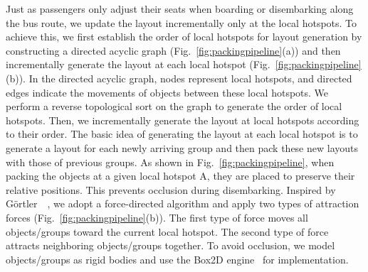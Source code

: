 Just as passengers only adjust their seats when boarding or disembarking along the bus route, we update the layout incrementally only at the local hotspots.
To achieve this, we first establish the order of local hotspots for layout generation by constructing a directed acyclic graph (Fig.~\ref{fig:packingpipeline}(a)) and then incrementally generate the layout at each local hotspot (Fig.~\ref{fig:packingpipeline}(b)).
In the directed acyclic graph, nodes represent local hotspots, and directed edges indicate the movements of objects between these local hotspots.
We perform a reverse topological sort on the graph to generate the order of local hotspots.
Then, we incrementally generate the layout at local hotspots according to their order.
The basic idea of generating the layout at each local hotspot is to generate a layout for each newly arriving group and then pack these new layouts with those of previous groups.
As shown in Fig.~\ref{fig:packingpipeline}, when packing the objects at a given local hotspot A, they are placed to preserve their relative positions.
This prevents occlusion during disembarking.
Inspired by G\"ortler~\etal~\cite{gortler2018bubble}, we adopt a force-directed algorithm and apply two types of attraction forces (Fig.~\ref{fig:packingpipeline}(b)).
The first type of force moves all objects/groups toward the current local hotspot.
The second type of force attracts neighboring objects/groups together.
To avoid occlusion, we model objects/groups as rigid bodies and use the Box2D engine~\cite{catto2010box2d} for implementation.






